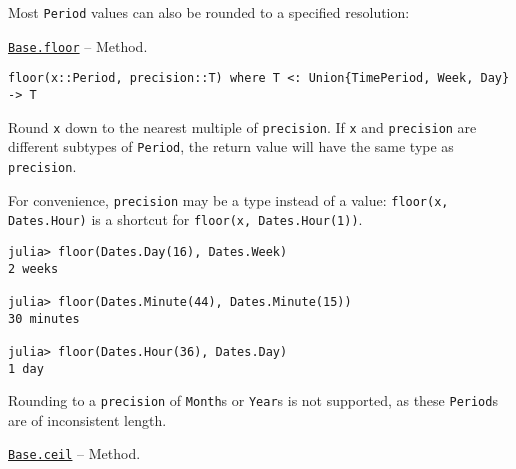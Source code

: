 Most \texttt{Period} values can also be rounded to a specified resolution:


\hypertarget{3559289051512772121}{} 
\hyperlink{3559289051512772121}{\texttt{Base.floor}}  -- {Method.}

\begin{adjustwidth}{2em}{0pt}


\begin{verbatim}
floor(x::Period, precision::T) where T <: Union{TimePeriod, Week, Day} -> T
\end{verbatim}

Round \texttt{x} down to the nearest multiple of \texttt{precision}. If \texttt{x} and \texttt{precision} are different subtypes of \texttt{Period}, the return value will have the same type as \texttt{precision}.

For convenience, \texttt{precision} may be a type instead of a value: \texttt{floor(x, Dates.Hour)} is a shortcut for \texttt{floor(x, Dates.Hour(1))}.


\begin{verbatim}
julia> floor(Dates.Day(16), Dates.Week)
2 weeks

julia> floor(Dates.Minute(44), Dates.Minute(15))
30 minutes

julia> floor(Dates.Hour(36), Dates.Day)
1 day
\end{verbatim}

Rounding to a \texttt{precision} of \texttt{Month}s or \texttt{Year}s is not supported, as these \texttt{Period}s are of inconsistent length.



\end{adjustwidth}
\hypertarget{6035166226319109738}{} 
\hyperlink{6035166226319109738}{\texttt{Base.ceil}}  -- {Method.}

